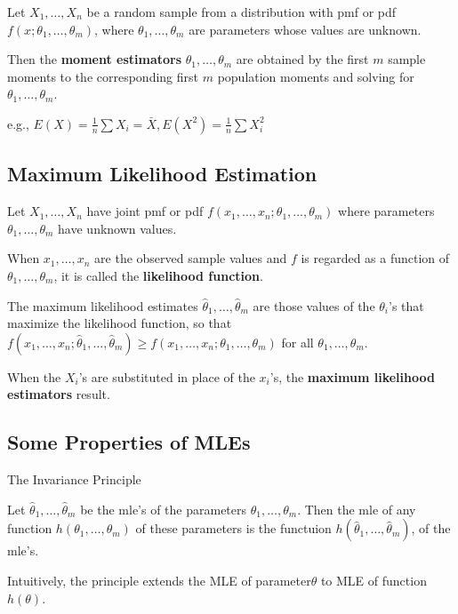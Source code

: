 \begin{definition}
    Let $X_1,\dots,X_n$ be a random sample from a distribution with pmf or pdf $f(x;\theta_1,\dots,\theta_m)$, where $\theta_1,\dots,\theta_m$ are parameters whose values are unknown. 

    Then the \textbf{moment estimators} $\theta_1,\dots,\theta_m$ are obtained by the first $m$ sample moments to the corresponding first $m$ population moments and solving for $\theta_1,\dots,\theta_m$.

    e.g., $E(X) = \frac{1}{n}\sum X_i = \bar{X}, E(X^2) = \frac{1}{n}\sum X_i^2$
\end{definition}

\subsection{Maximum Likelihood Estimation}

\begin{definition}
    Let $X_1,\dots,X_n$ have joint pmf or pdf $f(x_1,\dots,x_n;\theta_1,\dots,\theta_m)$ where parameters $\theta_1,\dots,\theta_m$ have unknown values. 

    When $x_1,\dots,x_n$ are the observed sample values and $f$ is regarded as a function of $\theta_1,\dots,\theta_m$, it is called the \textbf{likelihood function}. 

    The maximum likelihood estimates $\hat{\theta}_1,\dots,\hat{\theta}_m$ are those  values of the $\theta_i$'s that maximize the likelihood function, so that $f(x_1,\dots,x_n;\hat{\theta}_1,\dots,\hat{\theta}_m)\geq f(x_1,\dots,x_n;\theta_1,\dots,\theta_m)$ for all $\theta_1,\dots,\theta_m$.

    When the $X_i$'s are substituted in place of the $x_i$'s, the \textbf{maximum likelihood estimators} result.
\end{definition}

\subsection{Some Properties of MLEs}

\begin{proposition}
    The Invariance Principle

    Let $\hat{\theta}_1,\dots,\hat{\theta}_m$ be the mle's of the parameters $\theta_1,\dots,\theta_m$. Then the mle of any function $h(\theta_1,\dots,\theta_m)$ of these parameters is the functuion $h(\hat{\theta}_1,\dots,\hat{\theta}_m)$, of the mle's. 

    Intuitively, the principle extends the MLE of parameter$\theta$ to MLE of function$h(\theta)$.
\end{proposition}


